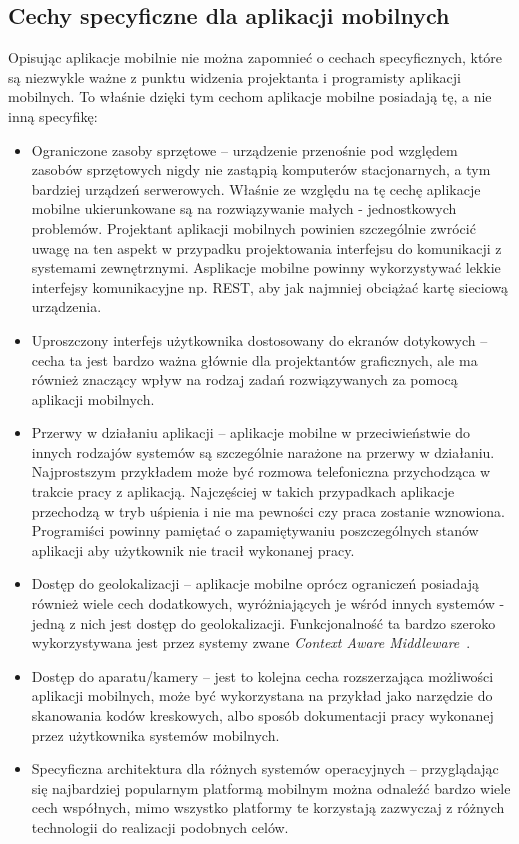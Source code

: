 \subsection{Cechy specyficzne dla aplikacji mobilnych }
\label{sec:cechyAplikacjiMobilnych}

Opisując aplikacje mobilnie nie można zapomnieć o cechach specyficznych, które są niezwykle ważne z punktu widzenia projektanta i programisty aplikacji mobilnych. To właśnie dzięki tym cechom aplikacje mobilne posiadają tę, a nie inną specyfikę:

\begin{itemize}
\item Ograniczone zasoby sprzętowe -- urządzenie przenośnie pod względem zasobów sprzętowych nigdy nie zastąpią komputerów stacjonarnych, a tym bardziej urządzeń serwerowych. Właśnie ze względu na tę cechę aplikacje mobilne ukierunkowane są na rozwiązywanie małych - jednostkowych problemów. Projektant aplikacji mobilnych powinien szczególnie zwrócić uwagę na ten aspekt w przypadku projektowania interfejsu do komunikacji z systemami zewnętrznymi. Asplikacje mobilne powinny wykorzystywać lekkie interfejsy komunikacyjne np. REST, aby jak najmniej obciążać kartę sieciową urządzenia. 
\item Uproszczony interfejs użytkownika dostosowany do ekranów dotykowych -- cecha ta jest bardzo ważna głównie dla projektantów graficznych, ale ma również znaczący wpływ na rodzaj zadań rozwiązywanych za pomocą aplikacji mobilnych.  
\item Przerwy w działaniu aplikacji -- aplikacje mobilne w przeciwieństwie do innych rodzajów systemów są szczególnie narażone na przerwy w działaniu. Najprostszym przykładem może być rozmowa telefoniczna przychodząca w trakcie pracy z aplikacją. Najczęściej w takich przypadkach aplikacje przechodzą w tryb uśpienia i nie ma pewności czy praca zostanie wznowiona. Programiści powinny pamiętać o zapamiętywaniu poszczególnych stanów aplikacji aby użytkownik nie tracił wykonanej pracy. 
\item Dostęp do geolokalizacji -- aplikacje mobilne oprócz ograniczeń posiadają również wiele cech dodatkowych, wyróżniających je wśród innych systemów - jedną z nich jest dostęp do  geolokalizacji.  Funkcjonalność ta bardzo szeroko wykorzystywana jest przez systemy zwane \textit{Context Aware Middleware}~\cite{ContextAwareMobility}. 
\item Dostęp do aparatu/kamery -- jest to kolejna cecha rozszerzająca możliwości aplikacji mobilnych, może być wykorzystana na przykład jako narzędzie do skanowania kodów kreskowych, albo sposób dokumentacji pracy wykonanej przez użytkownika systemów mobilnych. 
\item Specyficzna architektura dla różnych systemów operacyjnych -- przyglądając się najbardziej popularnym platformą mobilnym można odnaleźć bardzo wiele cech współnych, mimo wszystko platformy te korzystają zazwyczaj z różnych technologii do realizacji podobnych celów.
\end{itemize}

